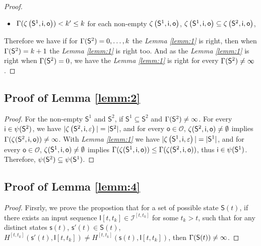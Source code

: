 \begin{appendices}
\begin{proof}
\begin{itemize}
 \item  $\Gamma(\zeta\left(\mathsf{S}^{1},\mathsf{i},\mathsf{o}\right))<k'\le k$ for each non-empty $\zeta\left(\mathsf{S}^{1},\mathsf{i},\mathsf{o}\right)$, $\zeta\left(\mathsf{S}^{1},\mathsf{i},\mathsf{o}\right)\subseteq \zeta\left(\mathsf{S}^{2},\mathsf{i},\mathsf{o}\right)$,
 \end{itemize} 
 Therefore we have if for $\Gamma(\mathsf{S}^{2})=0,\ldots, k$ the {\em Lemma \ref{lemm:1}} is right, then when $\Gamma(\mathsf{S}^{2})=k+1$ the {\em Lemma \ref{lemm:1}} is right too. 
And as the {\em Lemma \ref{lemm:1}} is right when $\Gamma(\mathsf{S}^{2})=0$, we have the {\em Lemma \ref{lemm:1}} is right for every $\Gamma(\mathsf{S}^{2})\ne \infty$.
 
\end{proof}
\subsection{Proof of Lemma \ref{lemm:2}}
\begin{proof}
For the non-empty $\mathsf{S}^{1}$ and $\mathsf{S}^{2}$, if $\mathsf{S}^{1}\subseteq\mathsf{S}^{2}$ and $\Gamma(\mathsf{S}^{2})\ne\infty$.
For every $\mathsf{i}\in \psi(\mathsf{S}^2)$, we have  $|\zeta\left(\mathsf{S}^2,\mathsf{i},\varepsilon\right)|=|\mathsf{S}^2|$, and 
for every $\mathsf{o} \in \mathcal{O}$, $\zeta(\mathsf{S}^2,\mathsf{i},\mathsf{o})\ne \emptyset$ implies $\Gamma(\zeta(\mathsf{S}^2,\mathsf{i},\mathsf{o}))\ne \infty$. With {\em Lemma \ref{lemm:1}} we have $|\zeta\left(\mathsf{S}^1,\mathsf{i},\varepsilon\right)|=|\mathsf{S}^1|$, and 
for every $\mathsf{o} \in \mathcal{O}$, $\zeta(\mathsf{S}^1,\mathsf{i},\mathsf{o})\ne \emptyset$ implies $\Gamma(\zeta(\mathsf{S}^1,\mathsf{i},\mathsf{o}))\le \Gamma(\zeta(\mathsf{S}^2,\mathsf{i},\mathsf{o}))$, thus $\mathsf{i}\in \psi(\mathsf{S}^1)$. Therefore, $\psi(\mathsf{S}^2)\subseteq\psi(\mathsf{S}^1)$.
\end{proof}




\subsection{Proof of Lemma \ref{lemm:4}}

\begin{proof}
Firsrly, we prove the propostion that for a set of possible state $\mathsf{S}(t)$, if there exists an input sequence $\mathsf{I}[t,t_k]\in\mathcal{I}^{[t,t_k]}$ for some $t_k >t$, such that for any distinct states $\mathsf{s}(t)$, $\mathsf{s}'(t) \in \mathsf{S}(t)$, $H^{[t,t_k]}(\mathsf{s}'(t),\mathsf{I}[t,t_k])\neq H^{[t,t_k]}(\mathsf{s}(t), \mathsf{I}[t,t_k])$, then $\Gamma(\mathsf{S}(t))\ne\infty$.


\end{proof}
\end{appendices}
